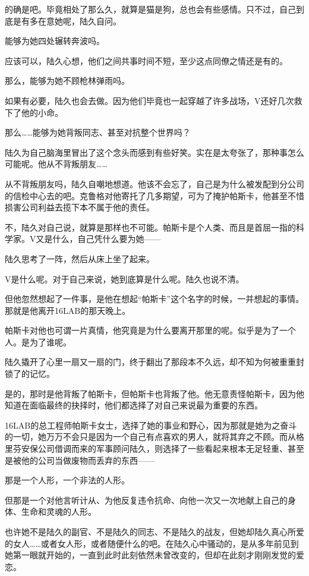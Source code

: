 的确是吧。毕竟相处了那么久，就算是猫是狗，总也会有些感情。只不过，自己到底是有多在意她呢，陆久自问。

能够为她四处辗转奔波吗。

应该可以，陆久心想，他们之间共事时间不短，至少这点同僚之情还是有的。

那么，能够为她不顾枪林弹雨吗。

如果有必要，陆久也会去做。因为他们毕竟也一起穿越了许多战场，V还好几次救下了他的小命。

那么……能够为她背叛同志、甚至对抗整个世界吗？

陆久为自己脑海里冒出了这个念头而感到有些好笑。实在是太夸张了，那种事怎么可能呢。他从不背叛朋友……

从不背叛朋友吗，陆久自嘲地想道。他该不会忘了，自己是为什么被发配到分公司的信检中心去的吧。克鲁格对他寄托了几多期望，可为了掩护帕斯卡，他甚至不惜损害公司利益去揽下本不属于他的责任。

不，陆久对自己说，就算是那样也不可能。帕斯卡是个人类、而且是首屈一指的科学家。V又是什么，自己凭什么要为她——

陆久思考了一阵，然后从床上坐了起来。

V是什么呢。对于自己来说，她到底算是什么呢。陆久也说不清。

但他忽然想起了一件事，是他在想起“帕斯卡”这个名字的时候，一并想起的事情。那就是他离开16LAB的那天晚上。

帕斯卡对他也可谓一片真情，他究竟是为什么要离开那里的呢。似乎是为了一个人。是为了谁呢。

陆久撬开了心里一扇又一扇的门，终于翻出了那段本不久远，却不知为何被重重封锁了的记忆。

是的，那时是他背叛了帕斯卡，但帕斯卡也背叛了他。他无意责怪帕斯卡，因为他知道在面临最终的抉择时，他们都选择了对自己来说最为重要的东西。

16LAB的总工程师帕斯卡女士，选择了她的事业和野心，因为那就是她为之奋斗的一切，她万万不会只是因为一个自己有点喜欢的男人，就将其弃之不顾。而从格里芬安保公司借调而来的军事顾问陆久，则选择了一些看起来根本无足轻重、甚至是被他的公司当做废物而丢弃的东西——

那是一个人形，一个非法的人形。

但那是一个对他言听计从、为他反复违令抗命、向他一次又一次地献上自己的身体、生命和灵魂的人形。 

也许她不是陆久的副官、不是陆久的同志、不是陆久的战友，但她却陆久真心所爱的女人……或者女人形，或者随便什么的吧。在陆久心中骚动的，是从多年前见到她第一眼就开始的，一直到此时此刻依然未曾改变的，但却在此刻才刚刚发觉的爱恋。

